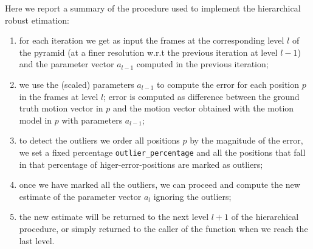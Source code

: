 \begin{figure}[!h]
    \removelatexerror
    
\end{figure}

Here we report a summary of the procedure used to implement the hierarchical robust etimation:
\begin{enumerate}
    \item for each iteration we get as input the frames at the corresponding level $l$ of the pyramid (at a finer resolution w.r.t the previous iteration at level $l-1$) and the parameter vector $a_{l-1}$ computed in the previous iteration;
    \item we use the (scaled) parameters $a_{l-1}$ to compute the error for each position $p$ in the frames at level $l$; error is computed as difference between the ground truth motion vector in $p$ and the motion vector obtained with the motion model in $p$ with parameters $a_{l-1}$;
    \item to detect the outliers we order all positions $p$ by the magnitude of the error, we set a fixed percentage \texttt{outlier\_percentage} and all the positions that fall in that percentage of higer-error-positions are marked as outliers;
    \item once we have marked all the outliers, we can proceed and compute the new estimate of the parameter vector $a_{l}$ ignoring the outliers;
    \item the new estimate will be returned to the next level $l+1$ of the hierarchical procedure, or simply returned to the caller of the function when we reach the last level.
\end{enumerate}